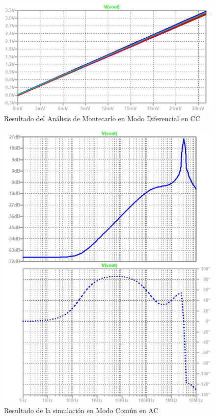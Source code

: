 \begin{figure}[ht]
\begin{center}
\includegraphics[scale=1]{res/spice/spice_dm_dc_mc.png}
\caption{Resultado del Análisis de Montecarlo en Modo Diferencial en CC}
\label{e4:fig_spice_dm_dc_mc}
\end{center}
\end{figure}

\begin{figure}[ht]
\begin{center}
\includegraphics[scale=1]{res/spice/spice_cm_ac_bode.png}
\caption{Resultado de la simulación en Modo Común en AC}
\label{e4:fig_spice_cm_ac_res}
\end{center}
\end{figure}

